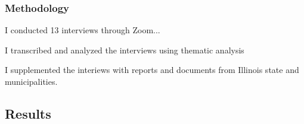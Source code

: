 \begin{frame}
    \frametitle{Methodology}

    I conducted 13 interviews through Zoom... 

    I transcribed and analyzed the interviews using thematic analysis

    I supplemented the interiews with reports and documents from Illinois state
    and municipalities.
\end{frame}

\subsection{Results}